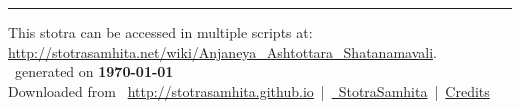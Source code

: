 \documentclass[oneside,12pt]{book}
\begin{document}
\setmainfont[Script=Devanagari,Mapping=tex-text]{Sanskrit 2003}
\fontsize {16}{19.25}\selectfont
\begin{center}

\end{center}
\vfill
\centering
\rule{0.8\textwidth}{0.6pt}

\footnotesize
{}\sffamily
This stotra can be accessed in multiple scripts at:\\
\url{http://stotrasamhita.net/wiki/Anjaneya_Ashtottara_Shatanamavali}.\\[1ex]
\faFilePdfO~generated on \textbf{\today}\\[1ex]
Downloaded from \faGlobe{}~\url{http://stotrasamhita.github.io}~|~\href{https://github.com/StotraSamhita}{\faGithubSquare{}~StotraSamhita}~|~\href{https://stotrasamhita.github.io/about/}{Credits}
\end{document}

